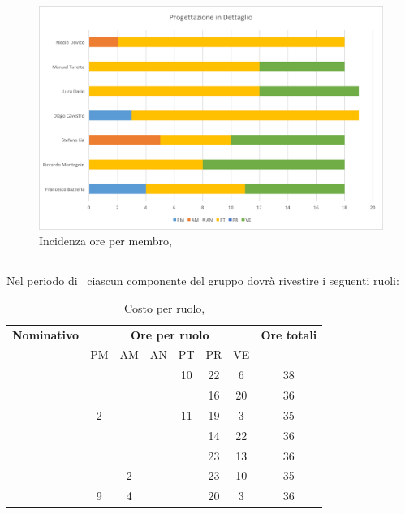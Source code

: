 \begin{figure}[H]
	\centering 
	\includegraphics[scale=0.7]{Immagini/GraficiPianoLavoro/PD.png}
	\caption{Incidenza ore per membro, \PD}
\end{figure}

\newpage
\subsection{\COD}
Nel periodo di \COD\ ciascun componente del gruppo dovrà rivestire i seguenti ruoli:

\begin{table}[h]
	\begin{center}
		\begin{tabular}{|c|c|c|c|c|c|c|c|}
			\hline
			\textbf{Nominativo} & \multicolumn{6}{c|}{\textbf{Ore per ruolo}} & \textbf{Ore totali} \\
					& PM & AM & AN & PT & PR & VE & \\
			\hline
			\FB		&	 &	  &	   & 10	& 22 &	6  &	38	\\
			\hline
			\RM		&	 &	  &	   & 	& 16 & 20 & 36	\\
			\hline
			\SL		& 2  &	  &	   & 11	& 19 & 3  &	35	\\
			\hline
			\DC		&	 &	  &	   &	& 14	 & 22 &	36	\\
			\hline
			\LD 	&	 &	  &	   &	& 23 & 13 &	36	\\
			\hline
			\MT		& 	 & 2  &	   &	& 23 & 10  &	35	\\
			\hline
			\ND 	& 9	 & 4  &	   &	& 20 & 3   & 36	\\
			\hline
		\end{tabular}
	\end{center}
	\caption{Costo per ruolo, \COD}
\end{table}


